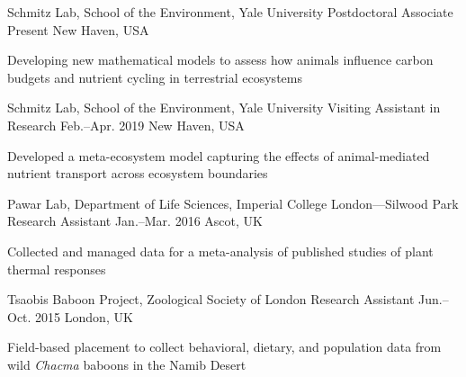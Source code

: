 

\begin{cventries}

  \cventry
    {Schmitz Lab, School of the Environment, Yale University} %
    {Postdoctoral Associate} %
    {Present} %
    {New Haven, USA} %
    {
      \begin{cvitems} %
        \item {Developing new mathematical models to assess how animals influence carbon budgets and nutrient cycling in terrestrial ecosystems}
      \end{cvitems} 
    }

  \cventry
    {Schmitz Lab, School of the Environment, Yale University} %
    {Visiting Assistant in Research} %
    {Feb.--Apr. 2019} %
    {New Haven, USA} %
    {
      \begin{cvitems} %
        \item {Developed a meta-ecosystem model capturing the effects of animal-mediated nutrient transport across ecosystem boundaries}
      \end{cvitems}  
    }

  \cventry
    {Pawar Lab, Department of Life Sciences, Imperial College London---Silwood Park} %
    {Research Assistant} %
    {Jan.--Mar. 2016} %
    {Ascot, UK} %
    {
      \begin{cvitems} %
        \item {Collected and managed data for a meta-analysis of published studies of plant thermal responses}
      \end{cvitems}  
    }

  \cventry
    {Tsaobis Baboon Project, Zoological Society of London} %
    {Research Assistant} %
    {Jun.--Oct. 2015} %
    {London, UK} %
    {
       \begin{cvitems} %
        \item {Field-based placement to collect behavioral, dietary, and population data from wild \textit{Chacma} baboons in the Namib Desert}
      \end{cvitems}  
    }


\end{cventries}
